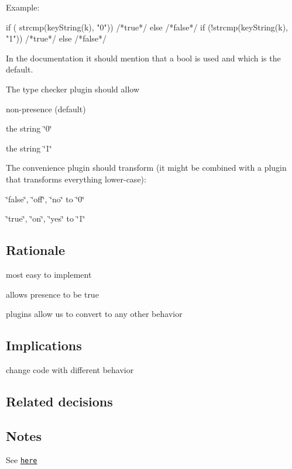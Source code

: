 Example\+: \begin{DoxyVerb}if ( strcmp(keyString(k), "0")) {/*true*/} else {/*false*/}
if (!strcmp(keyString(k), "1")) {/*true*/} else {/*false*/}
\end{DoxyVerb}


In the documentation it should mention that a bool is used and which is the default.

The type checker plugin should allow


\begin{DoxyItemize}
\item non-\/presence (default)
\item the string \char`\"{}0\char`\"{}
\item the string \char`\"{}1\char`\"{}
\end{DoxyItemize}

The convenience plugin should transform (it might be combined with a plugin that transforms everything lower-\/case)\+:


\begin{DoxyItemize}
\item \char`\"{}false\char`\"{}, \char`\"{}off\char`\"{}, \char`\"{}no\char`\"{} to \char`\"{}0\char`\"{}
\item \char`\"{}true\char`\"{}, \char`\"{}on\char`\"{}, \char`\"{}yes\char`\"{} to \char`\"{}1\char`\"{}
\end{DoxyItemize}

\subsection*{Rationale}


\begin{DoxyItemize}
\item most easy to implement
\item allows presence to be true
\item plugins allow us to convert to any other behavior
\end{DoxyItemize}

\subsection*{Implications}


\begin{DoxyItemize}
\item change code with different behavior
\end{DoxyItemize}

\subsection*{Related decisions}

\subsection*{Notes}

See \href{https://github.com/ElektraInitiative/libelektra/issues/308}{\tt here} 